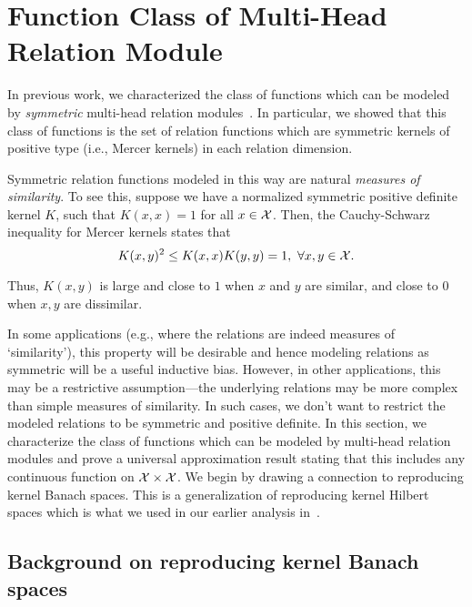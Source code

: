 \section{Function Class of Multi-Head Relation Module}\label{mhr_function_class}

In previous work, we characterized the class of functions which can be modeled by \textit{symmetric} multi-head relation modules~\citep{altabaaAbstractorsTransformer2023}. In particular, we showed that this class of functions is the set of relation functions which are symmetric kernels of positive type (i.e., Mercer kernels) in each relation dimension.

Symmetric relation functions modeled in this way are natural \textit{measures of similarity}. To see this, suppose we have a normalized symmetric positive definite kernel $K$, such that $K(x,x) = 1$ for all $x \in {\mathcal{X}}$. Then, the Cauchy-Schwarz inequality for Mercer kernels states that
\begin{equation}
    K(x, y)^2 \leq K(x, x) K(y, y) = 1, \ \forall x, y \in {\mathcal{X}}.
\end{equation}

Thus, $K(x,y)$ is large and close to $1$ when $x$ and $y$ are similar, and close to $0$ when $x, y$ are dissimilar. 

In some applications (e.g., where the relations are indeed measures of `similarity'), this property will be desirable and hence modeling relations as symmetric will be a useful inductive bias. However, in other applications, this may be a restrictive assumption---the underlying relations may be more complex than simple measures of similarity. In such cases, we don't want to restrict the modeled relations to be symmetric and positive definite. In this section, we characterize the class of functions which can be modeled by multi-head relation modules and prove a universal approximation result stating that this includes any continuous function on ${\mathcal{X}} \times {\mathcal{X}}$. We begin by drawing a connection to reproducing kernel Banach spaces. This is a generalization of reproducing kernel Hilbert spaces which is what we used in our earlier analysis in~\citep{altabaaAbstractorsTransformer2023}.


\subsection{Background on reproducing kernel Banach spaces}

